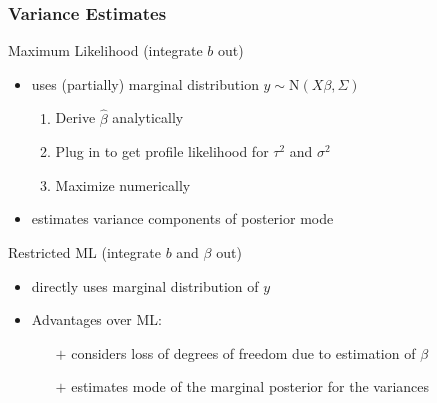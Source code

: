 \documentclass[final]{beamer}
\begin{document}
\begin{frame}
\frametitle{Variance Estimates}

\textcolor{beamer@postercolour}{Maximum Likelihood (integrate $b$ out)} 

\begin{itemize}
\item uses (partially) marginal distribution $y \sim \mathrm{N}(X\beta,\Sigma)$

\begin{enumerate}
\item Derive $\hat{\beta}$ analytically
\item Plug in to get profile likelihood for $\tau^2$ and $\sigma^2$
\item Maximize numerically
\end{enumerate}

\item estimates variance components of posterior mode
\end{itemize}

\vspace{1em}
\pause

\textcolor{beamer@postercolour}{Restricted ML (integrate $b$ and $\beta$ out)}

\begin{itemize}
\item directly uses marginal distribution of $y$

\item Advantages over ML:
\begin{itemize}
\item[$+$] considers loss of degrees of freedom due to estimation of $\beta$ 
\item[$+$] estimates mode of the marginal posterior for the variances
\end{itemize}
\end{itemize}


\end{frame}
\end{document}
